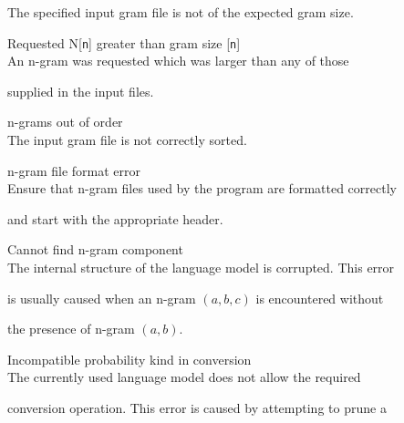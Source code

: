 \begin{itemize}
\begin{itemize}
        The specified input gram file is not of the expected gram size.





   Requested N[\texttt{n}] greater than gram size [\texttt{n}]\\


        An n-gram was requested which was larger than any of those


        supplied in the input files.





   n-grams out of order\\


        The input gram file is not correctly sorted.





   n-gram file format error\\


        Ensure that n-gram files used by the program are formatted correctly


        and start with the appropriate header.


\end{itemize}















\begin{itemize}


   Cannot find n-gram component\\


        The internal structure of the language model is corrupted. This error


        is usually caused when an n-gram $(a,b,c)$ is encountered without


        the presence of n-gram $(a,b)$.


   Incompatible probability kind in conversion\\      


        The currently used language model does not allow the required


        conversion operation. This error is caused by attempting to prune a



\end{itemize}
\end{itemize}
